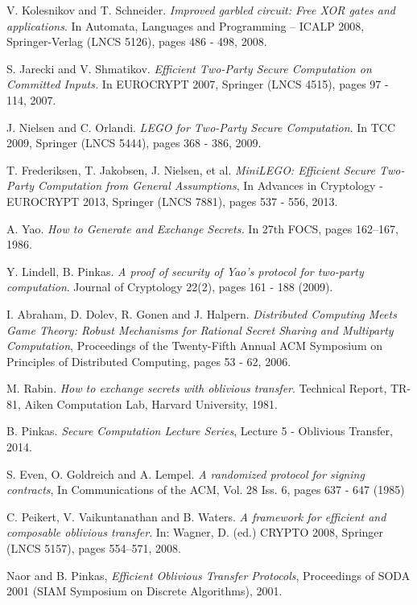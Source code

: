 \documentclass[ %
                    author={Nicholas Tutte},
                supervisor={Prof. Nigel Smart},
                    degree={MEng},
                     title={Secure Two Party Computation},
                  subtitle={A practical comparison of recent protocols},
                      type={Research - GG1K},
                      year={2015} ]{dissertation}
\begin{document}
\begin{thebibliography}{99}
			V. Kolesnikov and T. Schneider.
			\emph{Improved garbled circuit: Free XOR gates and applications}.
			In Automata, Languages and Programming – ICALP 2008, Springer-Verlag (LNCS 5126),
			pages 486 - 498,
			2008.

			S. Jarecki and V. Shmatikov.
			\emph{Efficient Two-Party Secure Computation on Committed Inputs.}
			In EUROCRYPT 2007, Springer (LNCS 4515),
			pages 97 - 114,
			2007.

			J. Nielsen and C. Orlandi. \emph{LEGO for Two-Party Secure Computation}. In TCC 2009, Springer (LNCS 5444), pages 368 - 386, 2009.

			T. Frederiksen, T. Jakobsen, J. Nielsen, et al. \emph{MiniLEGO: Efficient Secure Two-Party Computation from General Assumptions}, In Advances in Cryptology - EUROCRYPT 2013, Springer (LNCS 7881), pages 537 - 556, 2013.

			A. Yao. \emph{How to Generate and Exchange Secrets.} In 27th FOCS, pages 162–167, 1986.

			Y. Lindell, B. Pinkas. \emph{A proof of security of Yao’s protocol for two-party computation}. Journal of Cryptology 22(2), pages 161 - 188 (2009).

			I. Abraham, D. Dolev, R. Gonen and J. Halpern. \emph{Distributed Computing Meets Game Theory: Robust Mechanisms for Rational Secret Sharing and Multiparty Computation}, Proceedings of the Twenty-Fifth Annual ACM Symposium on Principles of Distributed Computing,  pages 53 - 62, 2006.

			M. Rabin. \emph{How to exchange secrets with oblivious transfer}. Technical Report, TR-81, Aiken Computation Lab, Harvard University, 1981.

			B. Pinkas. \emph{Secure Computation Lecture Series}, Lecture 5 - Oblivious Transfer, 2014.

			S. Even, O. Goldreich and A. Lempel. \emph{A randomized protocol for signing contracts}, In Communications of the ACM, Vol. 28 Iss. 6, pages 637 - 647 (1985)

			C. Peikert, V. Vaikuntanathan and B. Waters. \emph{A framework for efficient and composable oblivious transfer}. In: Wagner, D. (ed.) CRYPTO 2008, Springer (LNCS 5157), pages 554–571, 2008.

			Naor and B. Pinkas, \emph{Efficient Oblivious Transfer Protocols}, Proceedings of SODA 2001 (SIAM Symposium on Discrete Algorithms), 2001.


\end{thebibliography}
\end{document}
